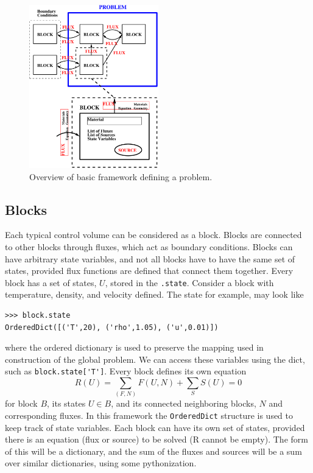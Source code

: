 \documentclass[11pt]{article}
\begin{document}
\begin{figure}
\centering
\includegraphics[width=0.5\textwidth]{overview.pdf}
\caption{Overview of basic framework defining a problem.}
\end{figure}
\subsection{Blocks}
Each typical control volume can be considered as a block. Blocks are connected to other blocks through fluxes, which act as boundary conditions. Blocks can have arbitrary state variables, and not all blocks have to have the same set of states, provided flux functions are defined that connect them together. Every block has a set of states, $U$, stored in the \lstinline{.state}. Consider a block with temperature, density, and velocity defined. The state for example, may look like
\begin{lstlisting}
>>> block.state
OrderedDict([('T',20), ('rho',1.05), ('u',0.01)])
\end{lstlisting}
where the ordered dictionary is used to preserve the mapping used in construction of the global problem. We can access these variables using the dict, such as \lstinline{block.state['T']}. Every block defines its own equation
\begin{equation}
R(U) = \sum_{(F,N)} F(U,N) + \sum_S S(U) = 0
\end{equation}
for block $B$, its states $U \in B$, and its connected neighboring blocks, $N$ and corresponding fluxes. In this framework the \lstinline{OrderedDict} structure is used to keep track of state variables. Each block can have its own set of states, provided there is an equation (flux or source) to be solved (R cannot be empty). The form of this will be a dictionary, and the sum of the fluxes and sources will be a sum over similar dictionaries, using some pythonization.
\end{document}
